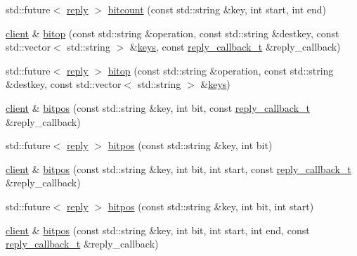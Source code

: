\begin{DoxyCompactItemize}
\item 
std\+::future$<$ \hyperlink{classcpp__redis_1_1reply}{reply} $>$ \hyperlink{classcpp__redis_1_1client_af2d2dc1c19d735e84d8e2725fb98dbda}{bitcount} (const std\+::string \&key, int start, int end)
\item 
\hyperlink{classcpp__redis_1_1client}{client} \& \hyperlink{classcpp__redis_1_1client_a9289b0f474073f59509b565d93c69506}{bitop} (const std\+::string \&operation, const std\+::string \&destkey, const std\+::vector$<$ std\+::string $>$ \&\hyperlink{classcpp__redis_1_1client_acb7845a206b2321e6919c2f38282c322}{keys}, const \hyperlink{classcpp__redis_1_1client_a061a1140d36d2eaeda82b09a0bb3f9f2}{reply\+\_\+callback\+\_\+t} \&reply\+\_\+callback)
\item 
std\+::future$<$ \hyperlink{classcpp__redis_1_1reply}{reply} $>$ \hyperlink{classcpp__redis_1_1client_adbb955ee435dea43898ef811b31421b3}{bitop} (const std\+::string \&operation, const std\+::string \&destkey, const std\+::vector$<$ std\+::string $>$ \&\hyperlink{classcpp__redis_1_1client_acb7845a206b2321e6919c2f38282c322}{keys})
\item 
\hyperlink{classcpp__redis_1_1client}{client} \& \hyperlink{classcpp__redis_1_1client_adf2ef5d020a8efbf6f6eb91cde63f262}{bitpos} (const std\+::string \&key, int bit, const \hyperlink{classcpp__redis_1_1client_a061a1140d36d2eaeda82b09a0bb3f9f2}{reply\+\_\+callback\+\_\+t} \&reply\+\_\+callback)
\item 
std\+::future$<$ \hyperlink{classcpp__redis_1_1reply}{reply} $>$ \hyperlink{classcpp__redis_1_1client_a5be47a4b3f9a36c4fab420468d50256a}{bitpos} (const std\+::string \&key, int bit)
\item 
\hyperlink{classcpp__redis_1_1client}{client} \& \hyperlink{classcpp__redis_1_1client_a8f6b7958a3094c975c3ca053b263c523}{bitpos} (const std\+::string \&key, int bit, int start, const \hyperlink{classcpp__redis_1_1client_a061a1140d36d2eaeda82b09a0bb3f9f2}{reply\+\_\+callback\+\_\+t} \&reply\+\_\+callback)
\item 
std\+::future$<$ \hyperlink{classcpp__redis_1_1reply}{reply} $>$ \hyperlink{classcpp__redis_1_1client_aa0ae004e45eb37ffed4d8c9f5ea35b4c}{bitpos} (const std\+::string \&key, int bit, int start)
\item 
\hyperlink{classcpp__redis_1_1client}{client} \& \hyperlink{classcpp__redis_1_1client_a3655449a666a9111d3dce7e61932ab1b}{bitpos} (const std\+::string \&key, int bit, int start, int end, const \hyperlink{classcpp__redis_1_1client_a061a1140d36d2eaeda82b09a0bb3f9f2}{reply\+\_\+callback\+\_\+t} \&reply\+\_\+callback)

\end{DoxyCompactItemize}
